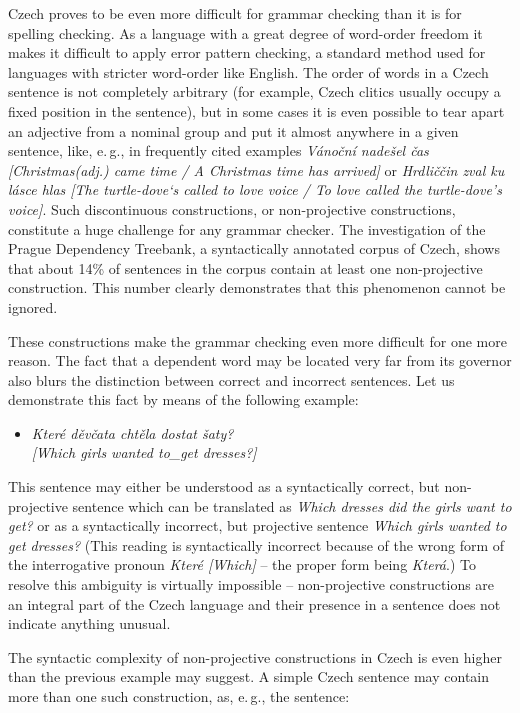 \begin{multicols}{2}
Czech proves to be even more difficult for grammar checking than it is for spelling checking. As a language with a great degree of word-order freedom it makes it difficult to apply error pattern checking, a standard method used for languages with stricter word-order like English. The order of words in a Czech sentence is not completely arbitrary (for example, Czech clitics usually occupy a fixed position in the sentence), but in some cases it is even possible to tear apart an adjective from a nominal group and put it almost anywhere in a given sentence, like, e.\,g., in frequently cited examples \textit{Vánoční nadešel čas {[}Christmas(adj.) came time / A Christmas time has arrived{]}} or \textit{Hrdliččin zval ku lásce hlas {[}The turtle-dove‘s called to love voice / To love called the turtle-dove’s voice{]}}. Such discontinuous constructions, or non-projective constructions, constitute a huge challenge for any grammar checker. The investigation of the Prague Dependency Treebank, a syntactically annotated corpus of Czech, shows that about 14\% of sentences in the corpus contain at least one non-projective construction. This number clearly demonstrates that this phenomenon cannot be ignored.

These constructions make the grammar checking even more difficult for one more reason. The fact that a dependent word may be located very far from its governor also blurs the distinction between correct and incorrect sentences. Let us demonstrate this fact by means of the following example:

\begin{itemize}
\item[] \textit{Které děvčata chtěla dostat šaty?\\
{[}Which girls wanted to\_get dresses?{]}}
\end{itemize}

This sentence may either be understood as a syntactically correct, but non-projective sentence which can be translated as \textit{Which dresses did the girls want to get?} or as a syntactically incorrect, but projective sentence \textit{Which girls wanted to get dresses?} (This reading is syntactically incorrect because of the wrong form of the interrogative pronoun \textit{Které {[}Which{]}} – the proper form being \textit{Která}.) To resolve this ambiguity is virtually impossible – non-projective constructions are an integral part of the Czech language and their presence in a sentence does not indicate anything unusual.

The syntactic complexity of non-projective constructions in Czech is even higher than the previous example may suggest. A simple Czech sentence may contain more than one such construction, as, e.\,g., the sentence:


\end{multicols}

